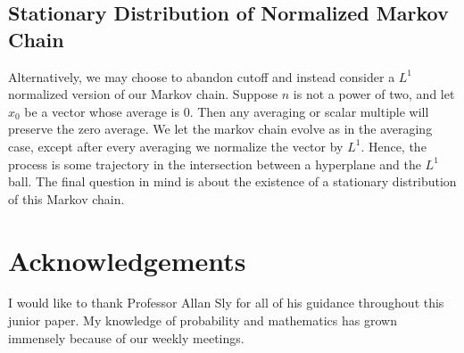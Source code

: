 \documentclass[12pt]{article}
\begin{document}
\subsection{Stationary Distribution of Normalized Markov Chain}

Alternatively, we may choose to abandon cutoff and instead consider a $L^1$ normalized version of our Markov chain. Suppose $n$ is not a power of two, and let $x_0$ be a vector whose average is $0$. Then any averaging or scalar multiple will preserve the zero average. We let the markov chain evolve as in the averaging case, except after every averaging we normalize the vector by $L^1$. Hence, the process is some trajectory in the intersection between a hyperplane and the $L^1$ ball. The final question in mind is about the existence of a stationary distribution of this Markov chain. 

\section*{Acknowledgements}

I would like to thank Professor Allan Sly for all of his guidance throughout this junior paper. My knowledge of probability and mathematics has grown immensely because of our weekly meetings. 

\cleardoublepage
{}
{}


\end{document}
